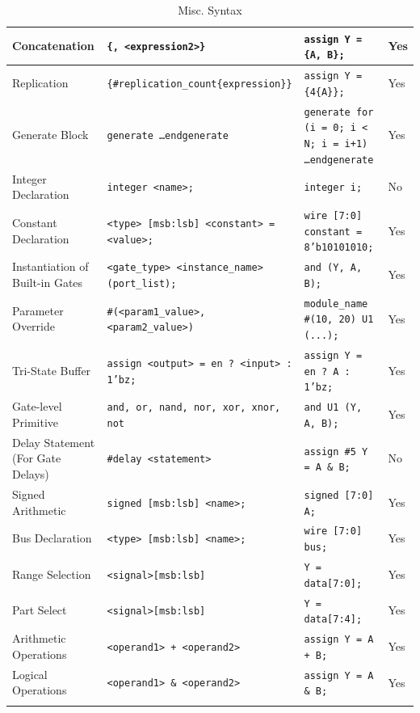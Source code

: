 \documentclass[12pt]{journal}
\begin{document}
\begin{longtable}{|>{\centering\arraybackslash}m{4cm}|>{\centering\arraybackslash}m{6cm}|>{\centering\arraybackslash}m{4cm}|>{\centering\arraybackslash}m{2cm}|}
\hline
Concatenation & \texttt{\{<expression1>, <expression2>\}} & \texttt{assign Y = \{A, B\};} & Yes \\
\hline
Replication & \texttt{\{\#replication\_count\{expression\}\}} & \texttt{assign Y = \{4\{A\}\};} & Yes \\
\hline
Generate Block & \texttt{generate \dots endgenerate} & \texttt{generate for (i = 0; i < N; i = i+1) \dots endgenerate} & Yes \\
\hline
Integer Declaration & \texttt{integer <name>;} & \texttt{integer i;} & No \\
\hline
Constant Declaration & \texttt{<type> [msb:lsb] <constant> = <value>;} & \texttt{wire [7:0] constant = 8'b10101010;} & Yes \\
\hline
Instantiation of Built-in Gates & \texttt{<gate\_type> <instance\_name> (port\_list);} & \texttt{and (Y, A, B);} & Yes \\
\hline
Parameter Override & \texttt{\#(<param1\_value>, <param2\_value>)} & \texttt{module\_name \#(10, 20) U1 (...);} & Yes \\
\hline
Tri-State Buffer & \texttt{assign <output> = en ? <input> : 1'bz;} & \texttt{assign Y = en ? A : 1'bz;} & Yes \\
\hline
Gate-level Primitive & \texttt{and, or, nand, nor, xor, xnor, not} & \texttt{and U1 (Y, A, B);} & Yes \\
\hline
Delay Statement (For Gate Delays) & \texttt{\#delay <statement>} & \texttt{assign \#5 Y = A \& B;} & No \\
\hline
Signed Arithmetic & \texttt{signed [msb:lsb] <name>;} & \texttt{signed [7:0] A;} & Yes \\
\hline
Bus Declaration & \texttt{<type> [msb:lsb] <name>;} & \texttt{wire [7:0] bus;} & Yes \\
\hline
Range Selection & \texttt{<signal>[msb:lsb]} & \texttt{Y = data[7:0];} & Yes \\
\hline
Part Select & \texttt{<signal>[msb:lsb]} & \texttt{Y = data[7:4];} & Yes \\
\hline
Arithmetic Operations & \texttt{<operand1> + <operand2>} & \texttt{assign Y = A + B;} & Yes \\
\hline
Logical Operations & \texttt{<operand1> \& <operand2>} & \texttt{assign Y = A \& B;} & Yes \\
\hline
\caption{Misc. Syntax}
\label{tab:misc}
\end{longtable}
\end{document}
